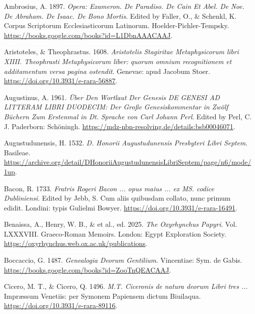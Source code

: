 \documentclass[
]{article}
\author{Dietmar Gerald Schrausser}
\date{10.05.2026}
\newlength{\cslhangindent}
\newlength{\cslentryspacingunit} %
\newenvironment{CSLReferences}[2] %
 {%
  \setlength{\parindent}{0pt}
  \ifodd #1
  \let\oldpar\par
  \def\par{\hangindent=\cslhangindent\oldpar}
  \fi
  \setlength{\parskip}{#2\cslentryspacingunit}
 }%
 {}
\begin{document}
\hypertarget{refs}{}
\begin{CSLReferences}{1}{0}
\leavevmode{}%
Ambrosius, A. 1897. \emph{Opera: Exameron. De Paradiso. De Cain Et Abel.
De Noe. De Abraham. De Isaac. De Bono Mortis}. Edited by Faller, O., \&
Schenkl, K. Corpus Scriptorum Ecclesiasticorum Latinorum.
Hoelder-Pichler-Tempsky.
\url{https://books.google.com/books?id=L1DbnAAACAAJ}.

\leavevmode{}%
Aristoteles, \& Theophrastus. 1608. \emph{{Aristotelis Stagiritae
Metaphysicorum libri XIIII. Theophrasti Metaphysicorum liber: quorum
omnium recognitionem et additamentum versa pagina ostendit}}. {Genevae}:
apud Jacobum Stoer. \url{https://doi.org/10.3931/e-rara-56887}.

\leavevmode{}%
Augustinus, A. 1961. \emph{Über Den Wortlaut Der Genesis DE GENESI AD
LITTERAM LIBRI DUODECIM: Der Große Genesiskommentar in Zwölf Büchern Zum
Erstenmal in Dt. Sprache von Carl Johann Perl}. Edited by Perl, C. J.
Paderborn: Schöningh.
\url{https://mdz-nbn-resolving.de/details:bsb00046071}.

\leavevmode{}%
Augustudunensis, H. 1532. \emph{D. Honorii Augustudunensis Presbyteri
Libri Septem}. Basileae.
\url{https://archive.org/detail/DHonoriiAugustudunensisLibriSeptem/page/n6/mode/1up}.

\leavevmode{}%
Bacon, R. 1733. \emph{{Fratris Rogeri Bacon ... opus maius ... ex MS.
codice Dubliniensi}}. Edited by Jebb, S. {Cum aliis quibusdam collato,
nunc primum edidit}. {Londini}: typis Gulielmi Bowyer.
\url{https://doi.org/10.3931/e-rara-16491}.

\leavevmode{}%
Benaissa, A., Henry, W. B., \& et al., ed. 2025. \emph{The Oxyrhynchus
Papyri}. Vol. LXXXVIII. Graeco-Roman Memoirs. London: Egypt Exploration
Society. \url{https://oxyrhynchus.web.ox.ac.uk/publications}.

\leavevmode{}%
Boccaccio, G. 1487. \emph{Genealogia Deorum Gentilium}. Vincentiae: Sym.
de Gabis. \url{https://books.google.com/books?id=ZooTnQEACAAJ}.

\leavevmode{}%
Cicero, M. T., \& Cicero, Q. 1496. \emph{{M.T. Ciceronis de natura
deorum Libri tres ...}} Impræssum Venetiis: per Symonem Papiensem dictum
Biuilaqua. \url{https://doi.org/10.3931/e-rara-89116}.


\end{CSLReferences}
\end{document}
